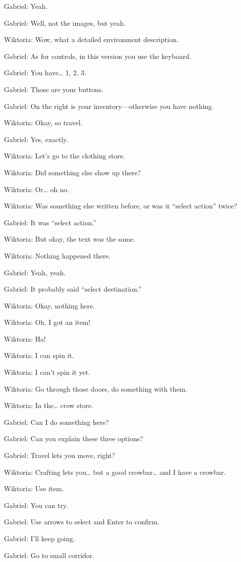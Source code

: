 Gabriel: Yeah.

Gabriel: Well, not the images, but yeah.

Wiktoria: Wow, what a detailed environment description.

Gabriel: As for controls, in this version you use the keyboard.

Gabriel: You have… 1, 2, 3.

Gabriel: Those are your buttons.

Gabriel: On the right is your inventory—otherwise you have nothing.

Wiktoria: Okay, so travel.

Gabriel: Yes, exactly.

Wiktoria: Let’s go to the clothing store.

Wiktoria: Did something else show up there?

Wiktoria: Or… oh no.

Wiktoria: Was something else written before, or was it “select action” twice?

Gabriel: It was “select action.”

Wiktoria: But okay, the text was the same.

Wiktoria: Nothing happened there.

Gabriel: Yeah, yeah.

Gabriel: It probably said “select destination.”

Wiktoria: Okay, nothing here.

Wiktoria: Oh, I got an item!

Wiktoria: Ha!

Wiktoria: I can spin it.

Wiktoria: I can’t spin it yet.

Wiktoria: Go through those doors, do something with them.

Wiktoria: In the… crow store.

Gabriel: Can I do something here?

Gabriel: Can you explain these three options?

Gabriel: Travel lets you move, right?

Wiktoria: Crafting lets you… but a good crowbar… and I have a crowbar.

Wiktoria: Use item.

Gabriel: You can try.

Gabriel: Use arrows to select and Enter to confirm.

Gabriel: I’ll keep going.

Gabriel: Go to small corridor.

